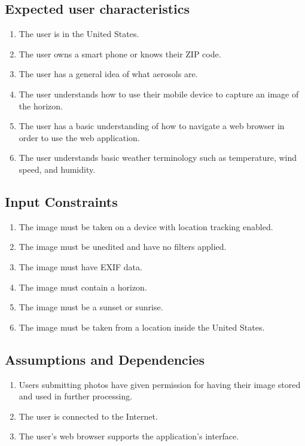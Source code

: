 \documentclass[journal,10pt,draftclsnofoot,onecolumn]{IEEEtran}
\begin{document}
\begin{singlespace}
	\subsection{Expected user characteristics}
		\begin{enumerate}
			\item The user is in the United States.
			\item The user owns a smart phone or knows their ZIP code.
			\item The user has a general idea of what aerosols are.
			\item The user understands how to use their mobile device to capture an image of the horizon.
			\item The user has a basic understanding of how to navigate a web browser in order to use the web application.
			\item The user understands basic weather terminology such as temperature, wind speed, and humidity.
		\end{enumerate}

	\subsection{Input Constraints}
		\begin{enumerate}
			\item The image must be taken on a device with location tracking enabled.
			\item The image must be unedited and have no filters applied.
			\item The image must have EXIF data.
			\item The image must contain a horizon.
			\item The image must be a sunset or sunrise.
			\item The image must be taken from a location inside the United States.
		\end{enumerate}

	\subsection{Assumptions and Dependencies}
		\begin{enumerate}
			\item Users submitting photos have given permission for having their image stored and used in further processing.
			\item The user is connected to the Internet.
			\item The user's web browser supports the application's interface.
		\end{enumerate}


\end{singlespace}
\end{document}
